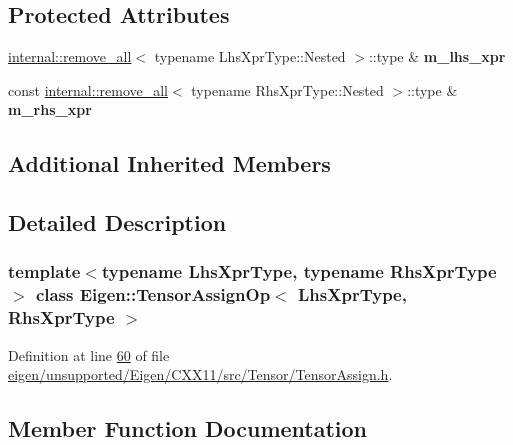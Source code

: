 \subsection*{Protected Attributes}
\begin{DoxyCompactItemize}
\item 
\mbox{\label{class_eigen_1_1_tensor_assign_op_a917fa4a6703ba3b07aeec57a7ed2a675}} 
\hyperlink{struct_eigen_1_1internal_1_1remove__all}{internal\+::remove\+\_\+all}$<$ typename Lhs\+Xpr\+Type\+::\+Nested $>$\+::type \& {\bfseries m\+\_\+lhs\+\_\+xpr}
\item 
\mbox{\label{class_eigen_1_1_tensor_assign_op_abdff4d1b0a3fa2b3c6a04c5d6c0fa78f}} 
const \hyperlink{struct_eigen_1_1internal_1_1remove__all}{internal\+::remove\+\_\+all}$<$ typename Rhs\+Xpr\+Type\+::\+Nested $>$\+::type \& {\bfseries m\+\_\+rhs\+\_\+xpr}
\end{DoxyCompactItemize}
\subsection*{Additional Inherited Members}


\subsection{Detailed Description}
\subsubsection*{template$<$typename Lhs\+Xpr\+Type, typename Rhs\+Xpr\+Type$>$\newline
class Eigen\+::\+Tensor\+Assign\+Op$<$ Lhs\+Xpr\+Type, Rhs\+Xpr\+Type $>$}



Definition at line \hyperlink{eigen_2unsupported_2_eigen_2_c_x_x11_2src_2_tensor_2_tensor_assign_8h_source_l00060}{60} of file \hyperlink{eigen_2unsupported_2_eigen_2_c_x_x11_2src_2_tensor_2_tensor_assign_8h_source}{eigen/unsupported/\+Eigen/\+C\+X\+X11/src/\+Tensor/\+Tensor\+Assign.\+h}.



\subsection{Member Function Documentation}
\mbox{\label{class_eigen_1_1_tensor_assign_op_a1a6f7336727e3f95616014883d514caa}} 
